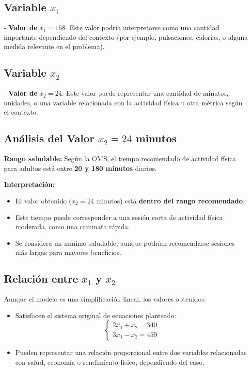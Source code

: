 \documentclass[a4paper,10pt]{article}
\begin{document}
\subsection*{Variable \(x_1\)}

- \textbf{Valor de } \( x_1 = 158 \). Este valor podría interpretarse como una cantidad importante dependiendo del contexto (por ejemplo, pulsaciones, calorías, o alguna medida relevante en el problema). 

\subsection*{Variable \(x_2\)}

- \textbf{Valor de } \( x_2 = 24 \). Este valor puede representar una cantidad de minutos, unidades, o una variable relacionada con la actividad física u otra métrica según el contexto.

\subsection*{Análisis del Valor \(x_2 = 24\) minutos}

\textbf{Rango saludable:} Según la OMS, el tiempo recomendado de actividad física para adultos está entre \textbf{20 y 180 minutos} diarios.

\textbf{Interpretación:}
\begin{itemize}
    \item El valor obtenido ($x_2 = 24$ minutos) está \textbf{dentro del rango recomendado}.
    \item Este tiempo puede corresponder a una sesión corta de actividad física moderada, como una caminata rápida.
    \item Se considera un mínimo saludable, aunque podrían recomendarse sesiones más largas para mayores beneficios.
\end{itemize}

\subsection*{Relación entre \(x_1\) y \(x_2\)}

Aunque el modelo es una simplificación lineal, los valores obtenidos:
\begin{itemize}
    \item Satisfacen el sistema original de ecuaciones planteado:  
    \[
    \begin{cases}
    2x_1 + x_2 = 340 \\
    3x_1 - x_2 = 450
    \end{cases}
    \]
    \item Pueden representar una relación proporcional entre dos variables relacionadas con salud, economía o rendimiento físico, dependiendo del caso.
\end{itemize}
\end{document}
